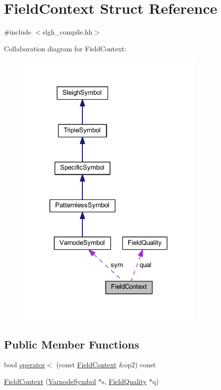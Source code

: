 \hypertarget{struct_field_context}{}\section{Field\+Context Struct Reference}
\label{struct_field_context}


{\ttfamily \#include $<$slgh\+\_\+compile.\+hh$>$}



Collaboration diagram for Field\+Context\+:
\nopagebreak
\begin{figure}[H]
\begin{center}
\leavevmode
\includegraphics[width=259pt]{struct_field_context__coll__graph}
\end{center}
\end{figure}
\subsection*{Public Member Functions}
\begin{DoxyCompactItemize}
\item 
bool \mbox{\hyperlink{struct_field_context_a54651b3da2cdfea0a6dae7cba6404a8b}{operator$<$}} (const \mbox{\hyperlink{struct_field_context}{Field\+Context}} \&op2) const
\item 
\mbox{\hyperlink{struct_field_context_a33f36afcd6333bc7d2c163322d345282}{Field\+Context}} (\mbox{\hyperlink{class_varnode_symbol}{Varnode\+Symbol}} $\ast$s, \mbox{\hyperlink{struct_field_quality}{Field\+Quality}} $\ast$q)
\end{DoxyCompactItemize}
